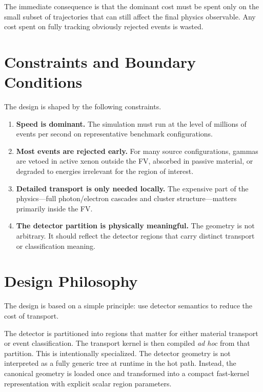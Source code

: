 \documentclass[11pt]{article}
\begin{document}
The immediate consequence is that the dominant cost must be spent only on the
small subset of trajectories that can still affect the final physics observable.
Any cost spent on fully tracking obviously rejected events is wasted.

\section{Constraints and Boundary Conditions}

The design is shaped by the following constraints.

\begin{enumerate}[label=\arabic*.]
\item \textbf{Speed is dominant.} The simulation must run at the level of
millions of events per second on representative benchmark configurations.

\item \textbf{Most events are rejected early.} For many source configurations,
gammas are vetoed in active xenon outside the FV, absorbed in passive material,
or degraded to energies irrelevant for the region of interest.

\item \textbf{Detailed transport is only needed locally.} The expensive part of
the physics---full photon/electron cascades and cluster structure---matters
primarily inside the FV.

\item \textbf{The detector partition is physically meaningful.} The geometry is
not arbitrary. It should reflect the detector regions that carry distinct
transport or classification meaning.
\end{enumerate}

\section{Design Philosophy}

The design is based on a simple principle: use detector semantics to reduce the
cost of transport.

The detector is partitioned into regions that matter for either material
transport or event classification. The transport kernel is then compiled
\emph{ad hoc} from that partition. This is intentionally specialized. The
detector geometry is not interpreted as a fully generic tree at runtime in the
hot path. Instead, the canonical geometry is loaded once and transformed into a
compact fast-kernel representation with explicit scalar region parameters.
\end{document}
